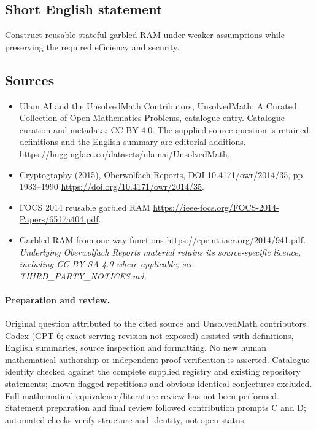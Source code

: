 \documentclass[11pt]{article}
\begin{document}
\subsection{Short English statement}
Construct reusable stateful garbled RAM under weaker assumptions while preserving the required efficiency and security.
\subsection{Sources}
\begin{itemize}
\item[\hypertarget{source:statement:1}{S1}] Ulam AI and the UnsolvedMath Contributors, UnsolvedMath: A Curated Collection of Open Mathematics Problems, catalogue entry. Catalogue curation and metadata: CC BY 4.0. The supplied source question is retained; definitions and the English summary are editorial additions.
\url{https://huggingface.co/datasets/ulamai/UnsolvedMath}.
\item[\hypertarget{source:statement:2}{S2}] Cryptography (2015), Oberwolfach Reports, DOI 10.4171/owr/2014/35, pp. 1933--1990
\url{https://doi.org/10.4171/owr/2014/35}.
\item[\hypertarget{source:statement:3}{S3}] FOCS 2014 reusable garbled RAM
\url{https://ieee-focs.org/FOCS-2014-Papers/6517a404.pdf}.
\item[\hypertarget{source:statement:4}{S4}] Garbled RAM from one-way functions
\url{https://eprint.iacr.org/2014/941.pdf}.
\textit{Underlying Oberwolfach Reports material retains its source-specific licence, including CC BY-SA 4.0 where applicable; see THIRD\_PARTY\_NOTICES.md.}
\end{itemize}
\paragraph{Preparation and review.}
Original question attributed to the cited source and UnsolvedMath contributors. Codex (GPT-6; exact serving revision not exposed) assisted with definitions, English summaries, source inspection and formatting. No new human mathematical authorship or independent proof verification is asserted. Catalogue identity checked against the complete supplied registry and existing repository statements; known flagged repetitions and obvious identical conjectures excluded. Full mathematical-equivalence/literature review has not been performed. Statement preparation and final review followed contribution prompts C and D; automated checks verify structure and identity, not open status.
\label{end:statement}
\end{document}

